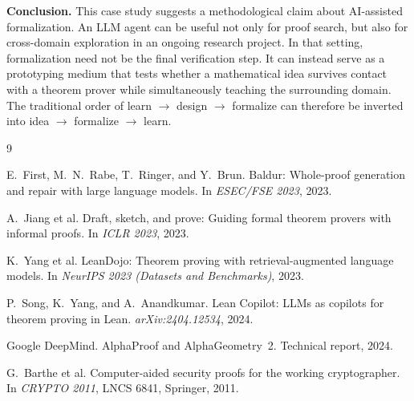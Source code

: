 \documentclass[11pt,a4paper]{article}
\begin{document}
\noindent\textbf{Conclusion.}
This case study suggests a methodological claim about AI-assisted formalization. An LLM agent can be useful not only for proof search, but also for cross-domain exploration in an ongoing research project. In that setting, formalization need not be the final verification step. It can instead serve as a prototyping medium that tests whether a mathematical idea survives contact with a theorem prover while simultaneously teaching the surrounding domain. The traditional order of learn $\to$ design $\to$ formalize can therefore be inverted into idea $\to$ formalize $\to$ learn.

\begingroup\footnotesize
\begin{thebibliography}{9}
\setlength{\itemsep}{0pt}\setlength{\parsep}{0pt}\setlength{\parskip}{0pt}

E.~First, M.~N.~Rabe, T.~Ringer, and Y.~Brun.
Baldur: Whole-proof generation and repair with large language models.
In \textit{ESEC/FSE 2023}, 2023.

A.~Jiang et al.
Draft, sketch, and prove: Guiding formal theorem provers with informal proofs.
In \textit{ICLR 2023}, 2023.

K.~Yang et al.
LeanDojo: Theorem proving with retrieval-augmented language models.
In \textit{NeurIPS 2023 (Datasets and Benchmarks)}, 2023.

P.~Song, K.~Yang, and A.~Anandkumar.
Lean Copilot: LLMs as copilots for theorem proving in Lean.
\textit{arXiv:2404.12534}, 2024.

Google DeepMind.
AlphaProof and AlphaGeometry~2. Technical report, 2024.

G.~Barthe et al.
Computer-aided security proofs for the working cryptographer.
In \textit{CRYPTO 2011}, LNCS 6841, Springer, 2011.

\end{thebibliography}
\endgroup
\end{document}
